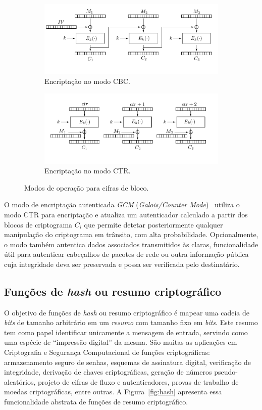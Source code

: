 \documentclass{SBCbookchapter}
\begin{document}
\begin{figure}[htbp]
\centering
\begin{subfigure}{\textwidth}
  \centering
  \includegraphics[width=.75\linewidth]{figures/cbc.pdf}
  \caption{Encriptação no modo CBC.}
  \label{fig:cbc}
\end{subfigure}
\begin{subfigure}{\textwidth}
  \centering
  \includegraphics[width=.75\linewidth]{figures/ctr.pdf}
  \caption{Encriptação no modo CTR.}
  \label{fig:ctr}
\end{subfigure}
\caption{Modos de operação para cifras de bloco.}
\label{fig:modos}
\end{figure}

O modo de encriptação autenticada \emph{GCM} (\emph{Galois/Counter Mode})~\cite{McGrewV04} utiliza o modo CTR para encriptação e atualiza um autenticador calculado a partir dos blocos de criptograma $C_i$ que permite detetar posteriormente qualquer manipulação do criptograma em trânsito, com alta probabilidade. Opcionalmente, o modo também autentica dados associados transmitidos às claras, funcionalidade útil para autenticar cabeçalhos de pacotes de rede ou outra informação pública cuja integridade deva ser preservada e possa ser verificada pelo destinatário.

\subsection{Funções de \emph{hash} ou resumo criptográfico}

O objetivo de funções de \emph{hash} ou resumo criptográfico é mapear uma cadeia de \emph{bits} de tamanho arbitrário em um \emph{resumo} com tamanho fixo em \emph{bits}. Este resumo tem como papel identificar unicamente a mensagem de entrada, servindo como uma espécie de ``impressão digital'' da mesma. São muitas as aplicações em Criptografia e Segurança Computacional de funções criptográficas: armazenamento seguro de senhas, esquemas de assinatura digital, verificação de integridade, derivação de chaves criptográficas, geração de números pseudo-aleatórios, projeto de cifras de fluxo e autenticadores, provas de trabalho de moedas criptográficas, entre outras. A Figura~\ref{fig:hash} apresenta essa funcionalidade abstrata de funções de resumo criptográfico.
\end{document}
